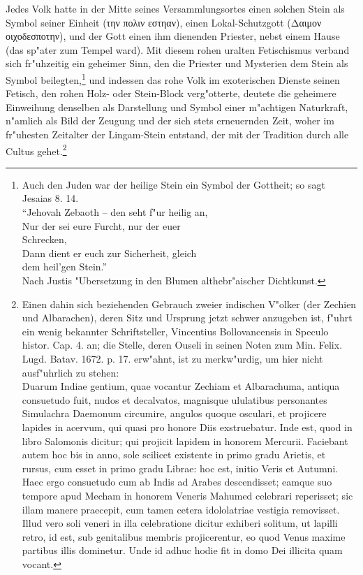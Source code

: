 \documentclass[a4paper, 11pt, oneside, polutonikogreek, german]{article}
\begin{document}
Jedes Volk hatte in der Mitte seines Versammlungsortes einen solchen Stein als Symbol seiner Einheit (την πολιν εστηαν), einen Lokal-Schutzgott (Δαιμον οιχοδεσποτην), und der Gott einen ihm dienenden Priester, nebst einem Hause (das sp"ater zum Tempel ward). Mit diesem rohen uralten Fetischismus verband sich fr"uhzeitig ein geheimer Sinn, den die Priester und Mysterien dem Stein als Symbol beilegten,\footnote{Auch den Juden war der heilige Stein ein Symbol der Gottheit; so sagt Jesaias 8. 14.\\
"`Jehovah Zebaoth -- den seht f"ur heilig an,\\
Nur der sei eure Furcht, nur der euer\\
\hspace*{1cm} Schrecken,\\
Dann dient er euch zur Sicherheit, gleich\\
\hspace*{1cm} dem heil'gen Stein."'\\
Nach Justis "Ubersetzung in den Blumen althebr"aischer Dichtkunst.} und indessen das rohe Volk im exoterischen Dienste seinen Fetisch, den rohen Holz- oder Stein-Block verg"otterte, deutete die geheimere Einweihung denselben als Darstellung und Symbol einer m"achtigen Naturkraft, n"amlich als Bild der Zeugung und der sich stets erneuernden Zeit, woher im fr"uhesten Zeitalter der Lingam-Stein entstand, der mit der Tradition durch alle Cultus gehet.\footnote{Einen dahin sich beziehenden Gebrauch zweier indischen V"olker (der Zechien und Albarachen), deren Sitz und Ursprung jetzt schwer anzugeben ist, f"uhrt ein wenig bekannter Schriftsteller, Vincentius Bollovancensis in Speculo histor. Cap. 4. an; die Stelle, deren Ouseli in seinen Noten zum Min. Felix. Lugd. Batav. 1672. p. 17. erw"ahnt, ist zu merkw"urdig, um hier nicht ausf"uhrlich zu stehen:\\
\hspace*{0.5cm} Duarum Indiae gentium, quae vocantur Zechiam et Albarachuma, antiqua consuetudo fuit, nudos et decalvatos, magnisque ululatibus personantes Simulachra Daemonum circumire, angulos quoque osculari, et projicere lapides in acervum, qui quasi pro honore Diis exstruebatur. Inde est, quod in libro Salomonis dicitur; qui projicit lapidem in honorem Mercurii. Faciebant autem hoc bis in anno, sole scilicet existente in primo gradu Arietis, et rursus, cum esset in primo gradu Librae: hoc est, initio Veris et Autumni. Haec ergo consuetudo cum ab Indis ad Arabes descendisset; eamque suo tempore apud Mecham in honorem Veneris Mahumed celebrari reperisset; sic illam manere praecepit, cum tamen cetera idololatriae vestigia removisset. Illud vero soli veneri in illa celebratione dicitur exhiberi solitum, ut lapilli retro, id est, sub genitalibus membris projicerentur, eo quod Venus maxime partibus illis dominetur. Unde id adhuc hodie fit in domo Dei illicita quam vocant.}
\end{document}
